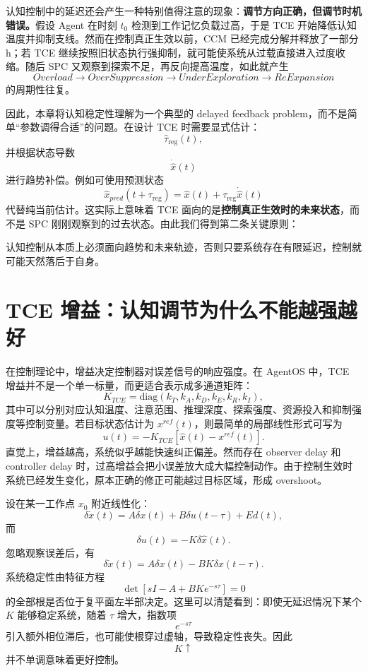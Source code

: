 认知控制中的延迟还会产生一种特别值得注意的现象：\textbf{调节方向正确，但调节时机错误。}假设 Agent 在时刻 $t_0$ 检测到工作记忆负载过高，于是 TCE 开始降低认知温度并抑制支线。然而在控制真正生效以前，CCM 已经完成分解并释放了一部分 h；若 TCE 继续按照旧状态执行强抑制，就可能使系统从过载直接进入过度收缩。随后 SPC 又观察到探索不足，再反向提高温度，如此就产生
\[
Overload
\rightarrow
OverSuppression
\rightarrow
UnderExploration
\rightarrow
ReExpansion
\]
的周期性往复。

因此，本章将认知稳定性理解为一个典型的 delayed feedback problem，而不是简单“参数调得合适”的问题。在设计 TCE 时需要显式估计：
\[
\hat{\tau}_{\mathrm{reg}}(t),
\]
并根据状态导数
\[
\dot{\hat{x}}(t)
\]
进行趋势补偿。例如可使用预测状态
\[
\hat{x}_{pred}(t+\tau_{\mathrm{reg}})
=
\hat{x}(t)
+
\tau_{\mathrm{reg}}
\dot{\hat{x}}(t)
\]
代替纯当前估计。这实际上意味着 TCE 面向的是\textbf{控制真正生效时的未来状态}，而不是 SPC 刚刚观察到的过去状态。由此我们得到第二条关键原则：
\begin{statementbox}
\centering
{}
\end{statementbox}
认知控制从本质上必须面向趋势和未来轨迹，否则只要系统存在有限延迟，控制就可能天然落后于自身。

\section{TCE 增益：认知调节为什么不能越强越好}

在控制理论中，增益决定控制器对误差信号的响应强度。在 AgentOS 中，TCE 增益并不是一个单一标量，而更适合表示成多通道矩阵：
\[
K_{TCE}
=
\mathrm{diag}
\left(
k_T,
k_A,
k_D,
k_E,
k_R,
k_I
\right),
\]
其中可以分别对应认知温度、注意范围、推理深度、探索强度、资源投入和抑制强度等控制变量。若目标状态估计为 $x^{ref}(t)$，则最简单的局部线性形式可写为
\[
u(t)
=
-K_{TCE}
\left[
\hat{x}(t)-x^{ref}(t)
\right].
\]
直觉上，增益越高，系统似乎越能快速纠正偏差。然而存在 observer delay 和 controller delay 时，过高增益会把小误差放大成大幅控制动作。由于控制生效时系统已经发生变化，原本正确的修正可能越过目标区域，形成 overshoot。

设在某一工作点 $x_0$ 附近线性化：
\[
\delta\dot{x}(t)
=
A\delta x(t)
+
B\delta u(t-\tau)
+
E d(t),
\]
而
\[
\delta u(t)
=
-K\delta\hat{x}(t).
\]
忽略观察误差后，有
\[
\delta\dot{x}(t)
=
A\delta x(t)
-
BK\delta x(t-\tau).
\]
系统稳定性由特征方程
\[
\det
\left[
sI-A+BK e^{-s\tau}
\right]
=
0
\]
的全部根是否位于复平面左半部决定。这里可以清楚看到：即使无延迟情况下某个 $K$ 能够稳定系统，随着 $\tau$ 增大，指数项
\[
e^{-s\tau}
\]
引入额外相位滞后，也可能使根穿过虚轴，导致稳定性丧失。因此
\[
K\uparrow
\]
并不单调意味着更好控制。

